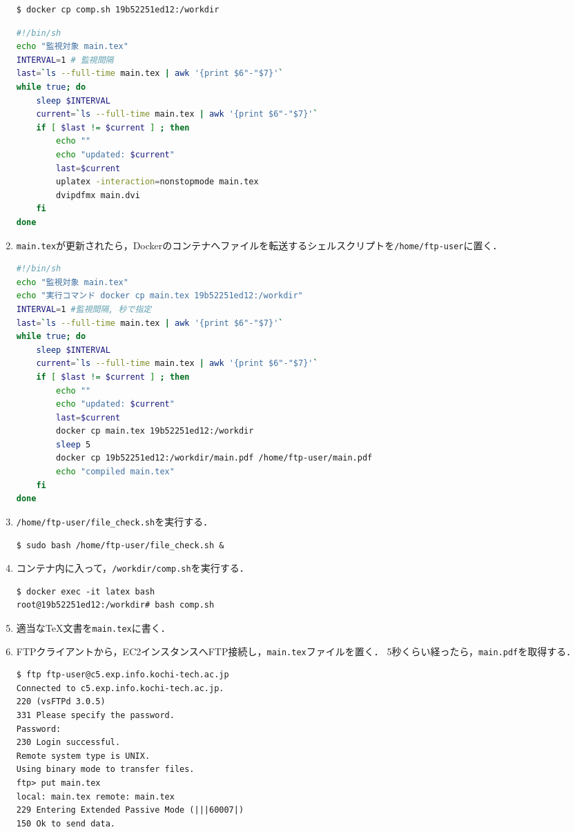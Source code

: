 \begin{enumerate}
          \begin{lstlisting}
$ docker cp comp.sh 19b52251ed12:/workdir
\end{lstlisting}
          \begin{lstlisting}[style=file,caption={\ttfamily 19b52251ed12:/workdir/comp.sh},language=Bash]
#!/bin/sh            
echo "監視対象 main.tex"
INTERVAL=1 # 監視間隔
last=`ls --full-time main.tex | awk '{print $6"-"$7}'`
while true; do
    sleep $INTERVAL
    current=`ls --full-time main.tex | awk '{print $6"-"$7}'`
    if [ $last != $current ] ; then
        echo ""
        echo "updated: $current"
        last=$current
        uplatex -interaction=nonstopmode main.tex
        dvipdfmx main.dvi
    fi
done        
\end{lstlisting}
    \item \texttt{main.tex}が更新されたら，Dockerのコンテナへファイルを転送するシェルスクリプトを\texttt{/home/ftp-user}に置く．
          \begin{lstlisting}[style=file,caption={\ttfamily /home/ftp-user/file\_check.sh},language=Bash]
#!/bin/sh
echo "監視対象 main.tex"
echo "実行コマンド docker cp main.tex 19b52251ed12:/workdir"
INTERVAL=1 #監視間隔, 秒で指定
last=`ls --full-time main.tex | awk '{print $6"-"$7}'`
while true; do
    sleep $INTERVAL
    current=`ls --full-time main.tex | awk '{print $6"-"$7}'`
    if [ $last != $current ] ; then
        echo ""
        echo "updated: $current"
        last=$current
        docker cp main.tex 19b52251ed12:/workdir
        sleep 5
        docker cp 19b52251ed12:/workdir/main.pdf /home/ftp-user/main.pdf
        echo "compiled main.tex"
    fi
done        
\end{lstlisting}
    \item \texttt{/home/ftp-user/file\_check.sh}を実行する．
          \begin{lstlisting}
$ sudo bash /home/ftp-user/file_check.sh &    
\end{lstlisting}
    \item コンテナ内に入って，\texttt{/workdir/comp.sh}を実行する．
          \begin{lstlisting}
$ docker exec -it latex bash
root@19b52251ed12:/workdir# bash comp.sh
\end{lstlisting}
    \item 適当な\TeX 文書を\texttt{main.tex}に書く．
    \item FTPクライアントから，EC2インスタンスへFTP接続し，\texttt{main.tex}ファイルを置く．
          5秒くらい経ったら，\texttt{main.pdf}を取得する．
          \begin{lstlisting}[basicstyle={\ttfamily\tiny}]
$ ftp ftp-user@c5.exp.info.kochi-tech.ac.jp
Connected to c5.exp.info.kochi-tech.ac.jp.
220 (vsFTPd 3.0.5)
331 Please specify the password.
Password: 
230 Login successful.
Remote system type is UNIX.
Using binary mode to transfer files.
ftp> put main.tex
local: main.tex remote: main.tex
229 Entering Extended Passive Mode (|||60007|)
150 Ok to send data.


\end{lstlisting}
\end{enumerate}
